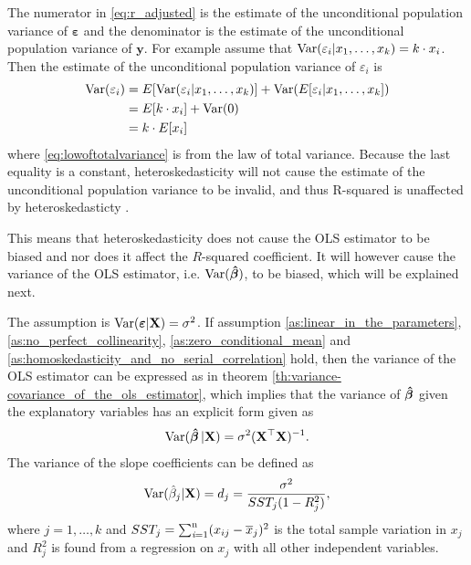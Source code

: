 
The numerator in \eqref{eq:r_adjusted} is the estimate of the unconditional population variance of $\boldsymbol{\varepsilon}$ and the denominator is the estimate of the unconditional population variance of $\textbf{y}$. 
For example assume that $\operatorname{\text{Var}}(\varepsilon_i | x_1, \ldots, x_k) = k \cdot x_i$. Then the estimate of the unconditional population variance of $\varepsilon_i$ is 
\begin{align}
     \operatorname{\text{Var}}(\varepsilon_i) &= E[\operatorname{\text{Var}}(\varepsilon_i | x_1, \ldots, x_k)] + \operatorname{\text{Var}}(E[\varepsilon_i | x_1, \ldots, x_k]) \label{eq:lowoftotalvariance}\\
    &= E[k \cdot x_i] + \operatorname{\text{Var}}(0) \nonumber \\
    &= k \cdot E[x_i] \nonumber
\end{align}
where \eqref{eq:lowoftotalvariance} is from the law of total variance. 
Because the last equality is a constant, heteroskedasticity will not cause the estimate of the unconditional population variance to be invalid, and thus R-squared is unaffected by heteroskedasticty \cite{Esben2019}.

This means that heteroskedasticity does not cause the OLS estimator to be biased and nor does it affect the $R$-squared coefficient.
It will however cause the variance of the OLS estimator, i.e. $\operatorname{\text{Var}}(\operatorname{\boldsymbol{\hat{\beta}}})$, to be biased, which will be explained next.  

The \homo assumption is $\operatorname{\text{Var}}(\boldsymbol{\varepsilon} | \mathbf{X}) = \sigma^2$. 
If assumption \ref{as:linear_in_the_parameters}, \ref{as:no_perfect_collinearity}, \ref{as:zero_conditional_mean} and \ref{as:homoskedasticity_and_no_serial_correlation} hold, then the variance of the OLS estimator can be expressed as in theorem \ref{th:variance-covariance_of_the_ols_estimator}, which implies that the variance of $\operatorname{\boldsymbol{\hat{\beta}}}$ given the explanatory variables has an explicit form given as
\begin{align*}
    \operatorname{\text{Var}}(\operatorname{\boldsymbol{\hat{\beta}}} | \mathbf{X}) = \sigma^2(\mathbf{X}^\top\mathbf{X})^{-1}.
\end{align*}
The variance of the slope coefficients can be defined as
\begin{align}\label{eq:slope_variance_OLS_estimator}
    \operatorname{\text{Var}}(\hat{\beta}_j|\mathbf{X}) = d_j = \dfrac{\sigma^2}{SST_j(1- R_j^2)},
\end{align}
where $j = 1, \ldots, k$ and $SST_j = \operatorname{\sum_{\textit{i}=1}^n} (x_{ij} - \overline{x}_j)^2$ is the total sample variation in $x_j$ and $R^2_j$ is found from a regression on $x_j$ with all other independent variables. 

